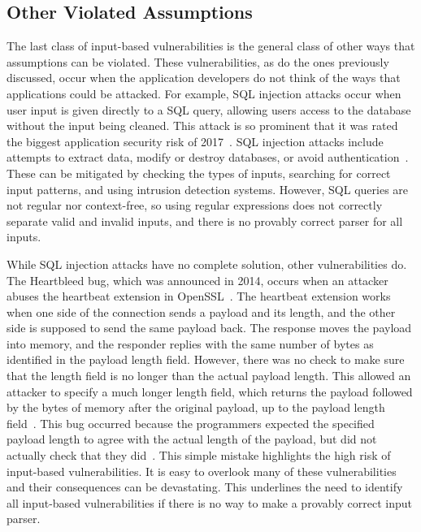 \subsection{Other Violated Assumptions}
\label{sec:otherViolatedAssumptions}
The last class of input-based vulnerabilities is the general class of other ways that assumptions can be violated.  These vulnerabilities, as do the ones previously discussed, occur when the application developers do not think of the ways that applications could be attacked.  For example, SQL injection attacks occur when user input is given directly to a SQL query, allowing users access to the database without the input being cleaned.  This attack is so prominent that it was rated the biggest application security risk of 2017~\cite{owasp_2018}.  SQL injection attacks include attempts to extract data, modify or destroy databases, or avoid authentication~\cite{halfond2006classification}.  These can be mitigated by checking the types of inputs, searching for correct input patterns, and using intrusion detection systems.  However, SQL queries are not regular nor context-free, so using regular expressions does not correctly separate valid and invalid inputs, and there is no provably correct parser for all inputs.

While SQL injection attacks have no complete solution, other vulnerabilities do.  The Heartbleed bug, which was announced in 2014, occurs when an attacker abuses the heartbeat extension in OpenSSL~\cite{mehta_codenomicon_2014}.  The heartbeat extension works when one side of the connection sends a payload and its length, and the other side is supposed to send the same payload back.  The response moves the payload into memory, and the responder replies with the same number of bytes as identified in the payload length field.  However, there was no check to make sure that the length field is no longer than the actual payload length.  This allowed an attacker to specify a much longer length field, which returns the payload followed by the bytes of memory after the original payload, up to the payload length field~\cite{Durumeric_2014_MH_2663716_2663755}.  This bug occurred because the programmers expected the specified payload length to agree with the actual length of the payload, but did not actually check that they did~\cite{bratus2017parsing}.  This simple mistake highlights the high risk of input-based vulnerabilities.  It is easy to overlook many of these vulnerabilities and their consequences can be devastating.  This underlines the need to identify all input-based vulnerabilities if there is no way to make a provably correct input parser.

